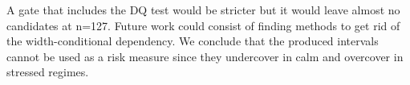 %
A gate that includes the DQ test would be stricter but it would leave almost no candidates at n=127. Future work could consist of finding methods to get rid of the width-conditional dependency. We conclude that the produced intervals cannot be used as a risk measure since they undercover in calm and overcover in stressed regimes.
%
%

